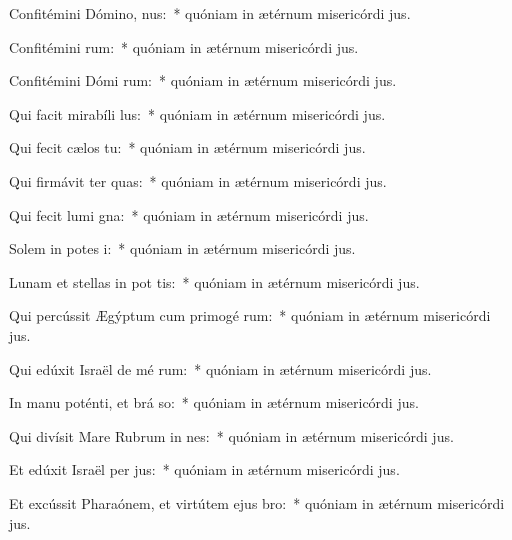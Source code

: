 \item Confitémini Dómino,  nus:~* quóniam in ætérnum misericórdi jus.
\item Confitémini  rum:~* quóniam in ætérnum misericórdi jus.
\item Confitémini Dómi rum:~* quóniam in ætérnum misericórdi jus.
\item Qui facit mirabíli  lus:~* quóniam in ætérnum misericórdi jus.
\item Qui fecit cælos  tu:~* quóniam in ætérnum misericórdi jus.
\item Qui firmávit ter  quas:~* quóniam in ætérnum misericórdi jus.
\item Qui fecit lumi gna:~* quóniam in ætérnum misericórdi jus.
\item Solem in potes i:~* quóniam in ætérnum misericórdi jus.
\item Lunam et stellas in pot tis:~* quóniam in ætérnum misericórdi jus.
\item Qui percússit Ægýptum cum primogé rum:~* quóniam in ætérnum misericórdi jus.
\item Qui edúxit Israël de mé rum:~* quóniam in ætérnum misericórdi jus.
\item In manu poténti, et brá so:~* quóniam in ætérnum misericórdi jus.
\item Qui divísit Mare Rubrum in nes:~* quóniam in ætérnum misericórdi jus.
\item Et edúxit Israël per  jus:~* quóniam in ætérnum misericórdi jus.
\item Et excússit Pharaónem, et virtútem ejus   bro:~* quóniam in ætérnum misericórdi jus.
